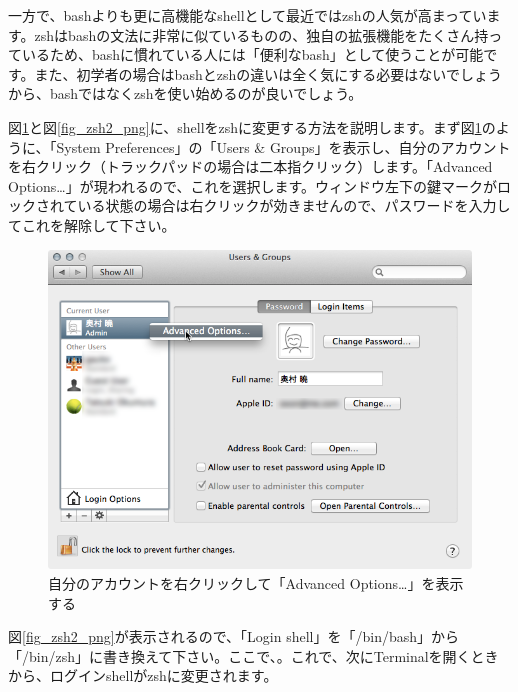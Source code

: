一方で、bashよりも更に高機能なshellとして最近ではzshの人気が高まっています。zshはbashの文法に非常に似ているものの、独自の拡張機能をたくさん持っているため、bashに慣れている人には「便利なbash」として使うことが可能です。また、初学者の場合はbashとzshの違いは全く気にする必要はないでしょうから、bashではなくzshを使い始めるのが良いでしょう。

図\ref{fig_zsh1_png}と図\ref{fig_zsh2_png}に、shellをzshに変更する方法を説明します。まず図\ref{fig_zsh1_png}のように、「System Preferences」の「Users \& Groups」を表示し、自分のアカウントを右クリック（トラックパッドの場合は二本指クリック）します。「Advanced Options\ldots」が現われるので、これを選択します。ウィンドウ左下の鍵マークがロックされている状態の場合は右クリックが効きませんので、パスワードを入力してこれを解除して下さい。

\begin{figure}
  \begin{center}
    \includegraphics[scale=0.35,bb= 0 0 668 504]{fig/zsh1.png}
    \caption{自分のアカウントを右クリックして「Advanced Options\ldots」を表示する}
    \label{fig_zsh1_png}
  \end{center}
\end{figure}

図\ref{fig_zsh2_png}が表示されるので、「Login shell」を「/bin/bash」から「/bin/zsh」に書き換えて下さい。ここで、{\bf{}}。これで、次にTerminalを開くときから、ログインshellがzshに変更されます。


